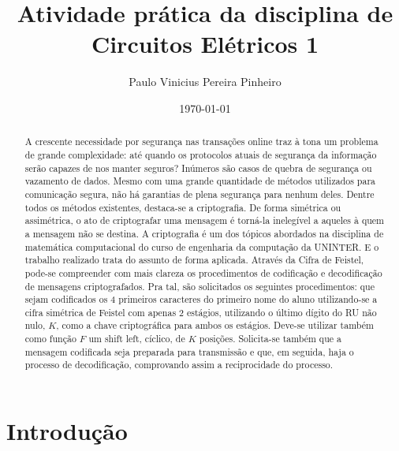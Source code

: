 \documentclass[a4paper,pra,aps,twocolumn,superscriptaddress,10pt,final]{revtex4-2}
\begin{document}
\title{Atividade prática da disciplina de Circuitos Elétricos 1}

\author{Paulo Vinicius Pereira Pinheiro}

\date{\today}

\begin{abstract}
    A crescente necessidade por segurança nas transações online traz à tona um problema de grande complexidade: até quando os protocolos atuais de segurança da informação serão capazes de nos manter seguros? Inúmeros são casos de quebra de segurança ou vazamento de dados. Mesmo com uma grande quantidade de métodos utilizados para comunicação segura, não há garantias de plena segurança para nenhum deles. Dentre todos os métodos existentes, destaca-se a criptografia. De forma simétrica ou assimétrica, o ato de criptografar uma mensagem é torná-la inelegível a aqueles à quem a mensagem não se destina. A criptografia é um dos tópicos abordados na disciplina de matemática computacional do curso de engenharia da computação da UNINTER. E o trabalho realizado trata do assunto de forma aplicada. Através da Cifra de Feistel, pode-se compreender com mais clareza os procedimentos de codificação e decodificação de mensagens criptografados. Pra tal, são solicitados os seguintes procedimentos: que sejam codificados os 4 primeiros caracteres do primeiro nome do aluno utilizando-se a cifra simétrica de Feistel com apenas 2 estágios, utilizando o último dígito do RU não nulo, $K$,  como a chave criptográfica para ambos os estágios. Deve-se utilizar também como função $F$ um shift left, cíclico, de $K$ posições. Solicita-se também que a mensagem codificada seja preparada para transmissão e que, em seguida, haja o processo de decodificação, comprovando assim a reciprocidade do processo.
    
    
\end{abstract}

\maketitle


\section{Introdução}
\label{sec:intro}
\end{document}
